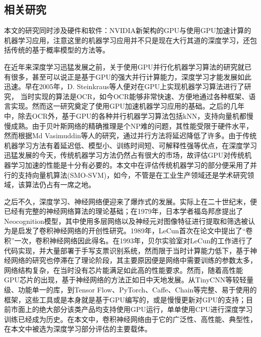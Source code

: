 \subsection{相关研究}
\par 本文的研究同时涉及硬件和软件：NVIDIA新架构的GPU与使用GPU加速计算的机器学习应用，注意这里的机器学习应用并不只是现在大行其道的深度学习，还包括传统的基于概率模型的方法等。
\par 在近年来深度学习迅猛发展之前，关于使用GPU并行化机器学习算法的研究就已有很多，甚至可以说正是基于GPU的强大并行计算能力，深度学习才能发展如此迅速。早在2005年，D. Steinkraus等人便对在GPU上实现机器学习算法进行了研究， 当时实现的算法是OCR，如今OCR能够非常快速、方便地通过各种框架、语言实现。然而这一研究奠定了使用GPU加速机器学习应用的基础\cite{GPUFORML}。之后的几年中，除去OCR外，基于GPU的各种并行机器学习算法包括kNN\cite{KNNG}，支持向量机\cite{SMOSVM}都慢慢成熟。由于贝叶斯网络的精确推理是个NP难的问题，其性能受限于硬件水平，然而根据Md Vasimuddin等人的研究\cite{BAYESINF}，通过并行方法将延迟降低了许多。由于传统机器学习方法有着延迟低、模型小、训练时间短、可解释性强等优点，在深度学习迅猛发展的今天，传统机器学习方法仍然占有很大的市场，故评估GPU对传统机器学习加速的性能是十分有必要的。本文中在评估传统机器学习的部分便采用了并行的支持向量机算法(SMO-SVM)，如今，不管是在工业生产领域还是学术研究领域，该算法仍占有一席之地。
\par 之后不久，深度学习、神经网络便迎来了爆炸式的发展。实际上在二十世纪末，便已经有完整的神经网络算法的理论基础；在1979年，日本学者福岛邦彦提出了Neocognition模型，其中使用多层网络以及神经元对图像特征进行提取和筛选被认为是启发了卷积神经网络的开创性研究\cite{JAPANESSAY}。1989年，LeCun首次在论文中提出了“卷积”一次，卷积神经网络因此得名\cite{LENET}。在1993年，贝尔实验室对LeCun的工作进行了代码实现，并大量部署于手写支票识别系统，然而限于当时计算能力低下，基于神经网络的研究也停滞在了理论阶段，其主要原因便是网络中需要训练的参数太多，网络结构复杂，在当时没有芯片能满足如此高的性能要求\cite{NNML}。然而，随着高性能GPU芯片的出现，基于神经网络的方法正如日中天地发展。从TinyCNN等较轻量级、功能单一的库，到Tensor Flow、PyTorch、Caffe、Chain等完整、易于使用的框架，这些工具或是本身就是基于GPU编写的，或是慢慢更新对GPU的支持；目前市面上的绝大部分该类产品均支持使用GPU运行，单单使用CPU进行深度学习训练已经成为历史。在本文中，卷积神经网络由于它的广泛性、高性能、典型性，在本文中被选为深度学习部分评估的主要载体。
